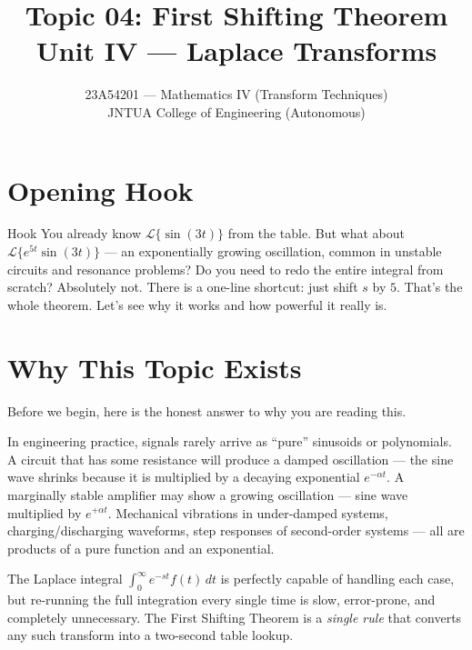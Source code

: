 \documentclass[12pt,a4paper]{article}
\title{Topic 04: First Shifting Theorem \\ \large Unit IV --- Laplace Transforms}
\author{23A54201 --- Mathematics IV (Transform Techniques) \\
        JNTUA College of Engineering (Autonomous)}
\date{}
\begin{document}
\maketitle
\tableofcontents
\newpage

\section{Opening Hook}

\begin{curiositybox}{Hook}
You already know $\mathcal{L}\{\sin(3t)\}$ from the table.
But what about $\mathcal{L}\{e^{5t}\sin(3t)\}$ --- an exponentially growing oscillation,
common in unstable circuits and resonance problems?
Do you need to redo the entire integral from scratch?
Absolutely not.
There is a one-line shortcut: just shift $s$ by $5$.
That's the whole theorem.
Let's see why it works and how powerful it really is.
\end{curiositybox}

\section{Why This Topic Exists}

Before we begin, here is the honest answer to why you are reading this.

In engineering practice, signals rarely arrive as ``pure'' sinusoids or polynomials.
A circuit that has some resistance will produce a damped oscillation ---
the sine wave shrinks because it is multiplied by a decaying exponential $e^{-\alpha t}$.
A marginally stable amplifier may show a growing oscillation --- sine wave multiplied by $e^{+\alpha t}$.
Mechanical vibrations in under-damped systems, charging/discharging waveforms, step responses of
second-order systems --- all are products of a pure function and an exponential.

The Laplace integral $\int_0^\infty e^{-st} f(t)\,dt$ is perfectly capable of handling each case,
but re-running the full integration every single time is slow, error-prone, and completely unnecessary.
The First Shifting Theorem is a \emph{single rule} that converts any such transform into a two-second
table lookup.
\end{document}
